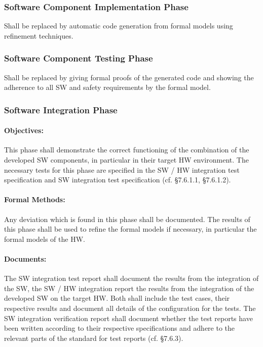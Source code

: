 \subsubsection{Software Component Implementation Phase}
\label{sec:softw-comp-impl}

Shall be replaced by automatic code generation from formal models using
refinement techniques.

\subsubsection{Software Component Testing Phase}
\label{sec:softw-comp-test}

Shall be replaced by giving formal proofs of the generated code and showing the
adherence to all SW and safety requirements by the formal model.

\subsubsection{Software Integration Phase}
\label{sec:softw-integr-phase}

\paragraph{Objectives:}
\label{sec:sw-int-objectives}
This phase shall demonstrate the correct functioning of the combination of the
developed SW components, in particular in their target HW environment. The
necessary tests for this phase are specified in the SW / HW integration test
specification and SW integration test specification (cf. §7.6.1.1, §7.6.1.2).

\paragraph{Formal Methods:}
\label{sec:sw-int-formal-methods}
Any deviation which is found in this phase shall be documented. The results of
this phase shall be used to refine the formal models if necessary, in particular
the formal models of the HW.

\paragraph{Documents:}
\label{sec:sw-int-documents}
The SW integration test report shall document the results from the integration
of the SW, the SW / HW integration report the results from the integration of
the developed SW on the target HW. Both shall include the test cases, their
respective results and document all details of the configuration for the
tests. The SW integration verification report shall document whether the test
reports have been written according to their respective specifications and
adhere to the relevant parts of the standard for test reports (cf. §7.6.3).

